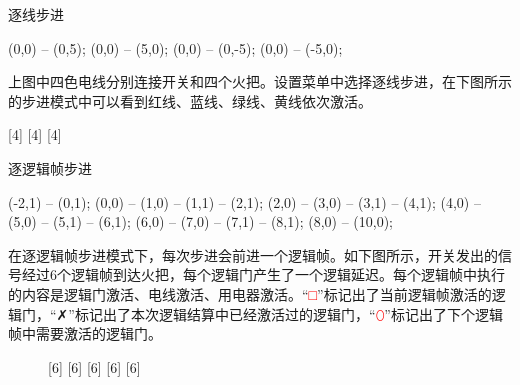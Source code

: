 \begin{example}{逐线步进}{}

  \begin{center}
    \begin{tikzpictureC}[TRsch]
       (0,0) -- (0,5);
       (0,0) -- (5,0);
       (0,0) -- (0,-5);
       (0,0) -- (-5,0);
    \end{tikzpictureC}
  \end{center}

  上图中四色电线分别连接开关和四个火把。设置菜单中选择逐线步进，在下图所示的步进模式中可以看到红线、蓝线、绿线、黄线依次激活。

  \begin{center}
    [4]%
    [4]%
    [4]%
  \end{center}

\end{example}

\begin{example}{逐逻辑帧步进}{}

  \begin{center}
    \begin{tikzpictureC}[TRsch]
       (-2,1) -- (0,1);
       (0,0) -- (1,0) -- (1,1) -- (2,1);
       (2,0) -- (3,0) -- (3,1) -- (4,1);
       (4,0) -- (5,0) -- (5,1) -- (6,1);
       (6,0) -- (7,0) -- (7,1) -- (8,1);
       (8,0) -- (10,0);
    \end{tikzpictureC}
  \end{center}

  在逐逻辑帧步进模式下，每次步进会前进一个逻辑帧。如下图所示，开关发出的信号经过6个逻辑帧到达火把，每个逻辑门产生了一个逻辑延迟。每个逻辑帧中执行的内容是逻辑门激活、电线激活、用电器激活。“\textcolor{red}{□}”标记出了当前逻辑帧激活的逻辑门，“✗”标记出了本次逻辑结算中已经激活过的逻辑门，“\textcolor{red}{⬯}”标记出了下个逻辑帧中需要激活的逻辑门。

  \begin{figure}[H]
    \centering
    [6]
    [6]
    [6]
    [6]
    [6]
  \end{figure}

\end{example}

